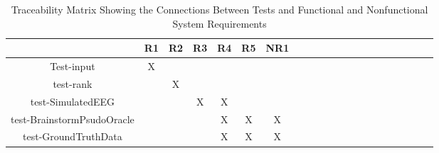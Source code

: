 \documentclass[12pt, titlepage]{article}
\begin{document}
\begin{table}[h!]
	\centering
	\begin{tabular}{|c|c|c|c|c|c|c|c|c|c|c|c|c|c|c|c|c|c|c|c|c|}
		\hline        
		& R1 & R2 & R3 & R4 & R5 & NR1 \\
		\hline
		Test-input        &X & & & & & \\ \hline
		test-rank        & &X & & & &  \\ \hline
		test-SimulatedEEG        & & &X & X& & \\ \hline
		test-BrainstormPsudoOracle        & & & &X & X& X \\ \hline
		test-GroundTruthData        & & & &X & X& X \\ \hline

	\end{tabular}
\caption{Traceability Matrix Showing the Connections Between Tests and Functional and Nonfunctional System Requirements}
\label{Table:A_trace}
\end{table}
				




%
%
%
%
%
%
\end{document}
